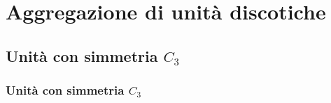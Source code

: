 \section{Aggregazione di unità discotiche}
\subsection{Unità con simmetria $C_3$}\begin{frame}\frametitle{Unità con simmetria $C_3$}
  \vspace{-5pt}   \begin{columns}
    \begin{figure}{}\end{figure}     
\begin{figure}{}\end{figure}

\end{columns}
\end{frame}

